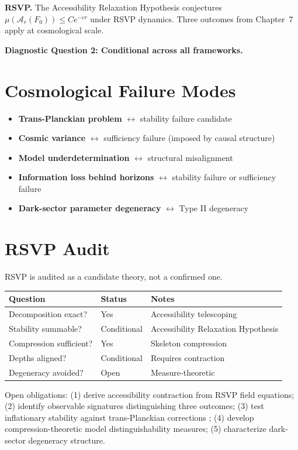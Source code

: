 \textbf{RSVP.} The Accessibility Relaxation Hypothesis conjectures $\mu(\mathcal{A}_r(F_0)) \leq Ce^{-cr}$ under RSVP dynamics. Three outcomes from Chapter~7 apply at cosmological scale.

\textbf{Diagnostic Question 2: Conditional across all frameworks.}

\section{Cosmological Failure Modes}

\begin{itemize}
  \item \textbf{Trans-Planckian problem} $\leftrightarrow$ stability failure candidate
  \item \textbf{Cosmic variance} $\leftrightarrow$ sufficiency failure (imposed by causal structure)
  \item \textbf{Model underdetermination} $\leftrightarrow$ structural misalignment
  \item \textbf{Information loss behind horizons} $\leftrightarrow$ stability failure or sufficiency failure
  \item \textbf{Dark-sector parameter degeneracy} $\leftrightarrow$ Type II degeneracy
\end{itemize}

\section{RSVP Audit}

RSVP is audited as a candidate theory, not a confirmed one.
\begin{center}\small
\begin{tabular}{lll}
\toprule
Question & Status & Notes \\
\midrule
Decomposition exact? & Yes & Accessibility telescoping \\
Stability summable? & Conditional & Accessibility Relaxation Hypothesis \\
Compression sufficient? & Yes & Skeleton compression \\
Depths aligned? & Conditional & Requires contraction \\
Degeneracy avoided? & Open & Measure-theoretic \\
\bottomrule
\end{tabular}
\end{center}

Open obligations: (1) derive accessibility contraction from RSVP field equations; (2) identify observable signatures distinguishing three outcomes; (3) test inflationary stability against trans-Planckian corrections \cite{Planck2020}; (4) develop compression-theoretic model distinguishability measures; (5) characterize dark-sector degeneracy structure.

